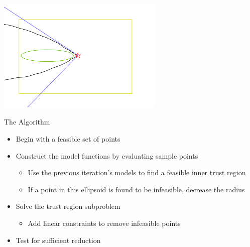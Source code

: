 \documentclass{beamer}
\begin{document}
\begin{frame}{}
\begin{center}
    \includegraphics[width=300px]{images/trust_regions.png}
\end{center}
\end{frame}



\begin{frame}{The Algorithm}
    \begin{itemize}
        \item Begin with a feasible set of points
        \item Construct the model functions by evaluating sample points
            \begin{itemize}
                \item Use the previous iteration's models to find a feasible inner trust region
                \item If a point in this ellipsoid is found to be infeasible, decrease the radius
            \end{itemize}
        \item Solve the trust region subproblem
            \begin{itemize}
                \item Add linear constraints to remove infeasible points
            \end{itemize}
        \item Test for sufficient reduction
    \end{itemize}
\end{frame}


\end{document}
